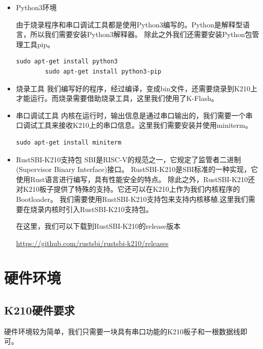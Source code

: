 \begin{itemize}
    \item Python3环境
    
    由于烧录程序和串口调试工具都是使用Python3编写的。Python是解释型语言，所以我们需要安装Python3解释器\cite{2009Python}。
    除此之外我们还需要安装Python包管理工具pip\cite{2013Installing}。

    \begin{lstlisting}[caption={安装Python3环境}, label={lst:install_python3}]
        sudo apt-get install python3
        sudo apt-get install python3-pip
    \end{lstlisting}

    \item 烧录工具
    我们编写好的程序，经过编译，变成bin文件，还需要烧录到K210上才能运行。而烧录需要借助烧录工具，这里我们使用了K-Flash。
    \item 串口调试工具
    内核在运行时，输出信息是通过串口输出的，我们需要一个串口调试工具来接收K210上的串口信息。这里我们需要安装并使用miniterm。

    \begin{lstlisting}[caption={安装miniterm}, label={lst:install_miniterm}]
        sudo apt-get install miniterm
    \end{lstlisting}

    \item RustSBI-K210支持包
    SBI是RISC-V的规范之一，它规定了监管者二进制(Supervisor Binary Interface)接口。
    RustSBI-K210是SBI标准的一种实现，它使用Rust语言进行编写，具有性能安全的特点。
    除此之外，RustSBI-K210还对K210板子提供了特殊的支持。它还可以在K210上作为我们内核程序的Bootloader\cite{马学文2005嵌入式系统中}。
    我们需要使用RustSBI-K210支持包来支持内核移植,这里我们需要在烧录内核时引入RustSBI-K210支持包。

    在这里，我们可以下载到RustSBI-K210的release版本

    \href{https://github.com/rustsbi/rustsbi-k210/releases}{https://github.com/rustsbi/rustsbi-k210/releases}
    
\end{itemize}

\section{硬件环境}

\subsection{K210硬件要求}

硬件环境较为简单，我们只需要一块具有串口功能的K210板子和一根数据线即可。

